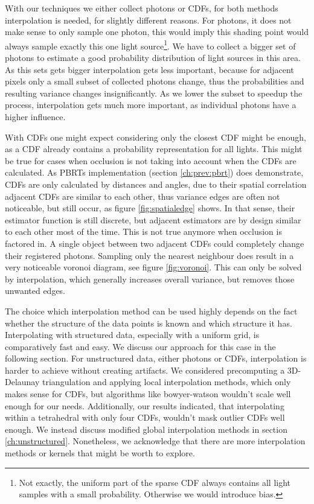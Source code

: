 With our techniques we either collect photons or CDFs, for both methods interpolation is needed, for slightly different reasons. For photons, it does not make sense to only sample one photon, this would imply this shading point would always sample exactly this one light source\footnote{Not exactly, the uniform part of the sparse CDF always contains all light samples with a small probability. Otherwise we would introduce bias.}. We have to collect a bigger set of photons to estimate a good probability distribution of light sources in this area. As this sets gets bigger interpolation gets less important, because for adjacent pixels only a small subset of collected photons change, thus the probabilities and resulting variance changes insignificantly. As we lower the subset to speedup the process, interpolation gets much more important, as individual photons have a higher influence.

With CDFs one might expect considering only the closest CDF might be enough, as a CDF already contains a probability representation for all lights. This might be true for cases when occlusion is not taking into account when the CDFs are calculated. As PBRTs implementation (section \ref{ch:prev:pbrt}) does demonstrate, CDFs are only calculated by distances and angles, due to their spatial correlation adjacent CDFs are similar to each other, thus variance edges are often not noticeable, but still occur, as figure \ref{fig:spatialedge} shows. In that sense, their estimator function is still discrete, but adjacent estimators are by design similar to each other most of the time. This is not true anymore when occlusion is factored in. A single object between two adjacent CDFs could completely change their registered photons. Sampling only the nearest neighbour does result in a very noticeable voronoi diagram, see figure \ref{fig:voronoi}. This can only be solved by interpolation, which generally increases overall variance, but removes those unwanted edges.

The choice which interpolation method can be used highly depends on the fact whether the structure of the data points is known and which structure it has. Interpolating with structured data, especially with a uniform grid, is comparatively fast and easy. We discuss our approach for this case in the following section. For unstructured data, either photons or CDFs, interpolation is harder to achieve without creating artifacts. We considered precomputing a 3D-Delaunay triangulation and applying local interpolation methods, which only makes sense for CDFs, but algorithms like bowyer-watson wouldn't scale well enough for our needs. Additionally, our results indicated, that interpolating within a tetrahedral with only four CDFs, wouldn't mask outlier CDFs well enough. We instead discuss modified global interpolation methods in section \ref{ch:unstructured}. Nonetheless, we acknowledge that there are more interpolation methods or kernels that might be worth to explore.

